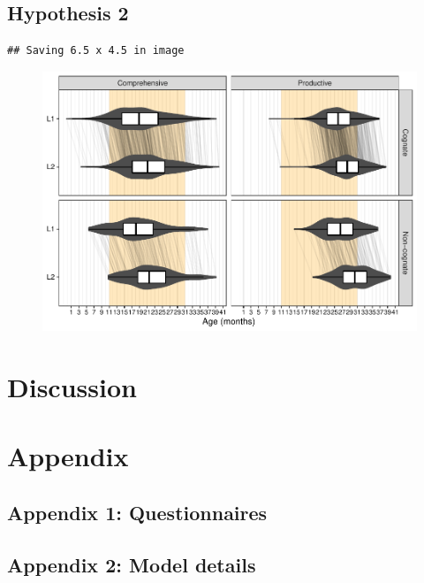 \documentclass[
  english,
  man,man,floatsintext]{apa6}
\begin{document}
\hypertarget{hypothesis-2}{%
\subsection{Hypothesis 2}\label{hypothesis-2}}

\begin{verbatim}
## Saving 6.5 x 4.5 in image
\end{verbatim}

\begin{figure}

{\centering \includegraphics[width=0.8\linewidth]{trajectories_manuscript_files/figure-latex/aoafig-1} 

}

\caption{ }\label{fig:aoafig}
\end{figure}

\hypertarget{discussion}{%
\section{Discussion}\label{discussion}}

\hypertarget{appendix}{%
\section{Appendix}\label{appendix}}

\hypertarget{appendix-1-questionnaires}{%
\subsection{Appendix 1: Questionnaires}\label{appendix-1-questionnaires}}

\hypertarget{appendix-2-model-details}{%
\subsection{Appendix 2: Model details}\label{appendix-2-model-details}}
\end{document}
